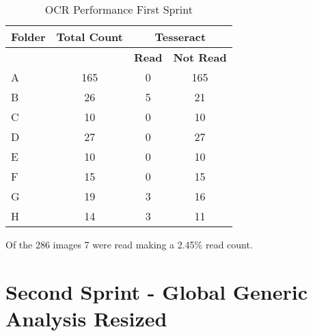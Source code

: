 \begin{table}[h]
    \centering
    \caption{OCR Performance First Sprint}
    \label{tab:first_sprint}
    \begin{tabular}{|l|c|c|c|}
        \hline
        \textbf{Folder} & \textbf{Total Count} & \multicolumn{2}{c|}{\textbf{Tesseract}}                     \\
        \hline
                        &                      & \textbf{Read}                           & \textbf{Not Read} \\
        \hline
        A               & 165                  & 0                                       & 165               \\
        B               & 26                   & 5                                       & 21                \\
        C               & 10                   & 0                                       & 10                \\
        D               & 27                   & 0                                       & 27                \\
        E               & 10                   & 0                                       & 10                \\
        F               & 15                   & 0                                       & 15                \\
        G               & 19                   & 3                                       & 16                \\
        H               & 14                   & 3                                       & 11                \\
        \hline
    \end{tabular}
\end{table}



Of the 286 images 7 were read making a 2.45\% read count.

\section{Second Sprint - Global Generic Analysis Resized}


